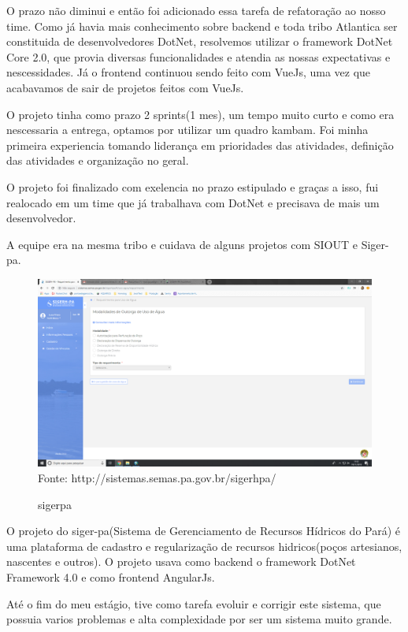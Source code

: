 O prazo não diminui e então foi adicionado essa tarefa de refatoração ao nosso time.
Como já havia mais conhecimento sobre backend e toda tribo Atlantica ser constituida de desenvolvedores DotNet, resolvemos utilizar o framework DotNet Core 2.0, que 
provia diversas funcionalidades e atendia as nossas expectativas e nescessidades.
Já o frontend continuou sendo feito com VueJs, uma vez que acabavamos de sair de projetos feitos com VueJs.

O projeto tinha como prazo 2 sprints(1 mes), um tempo muito curto e como era nescessaria a entrega, optamos por utilizar um quadro kambam.
Foi minha primeira experiencia tomando liderança em prioridades das atividades, definição das atividades e organização no geral.

O projeto foi finalizado com exelencia no prazo estipulado e graças a isso, fui realocado em um time que já trabalhava com DotNet e precisava de mais um desenvolvedor.

A equipe era na mesma tribo e cuidava de alguns projetos com SIOUT e Siger-pa.

\begin{figure}[H]
\centering
\caption{sigerpa} %
\includegraphics[scale=0.222]{sigerpa}\\  %
{\small Fonte: http://sistemas.semas.pa.gov.br/sigerhpa/} %
\label{fig:exemplo} %
\end{figure}

O projeto do siger-pa(Sistema de Gerenciamento de Recursos Hídricos do Pará) é uma plataforma de cadastro e regularização de recursos hidricos(poços artesianos, nascentes e outros).
O projeto usava como backend o framework DotNet Framework 4.0 e como frontend AngularJs.

Até o fim do meu estágio, tive como tarefa evoluir e corrigir este sistema, que possuia varios problemas e alta complexidade por ser um sistema muito grande.
